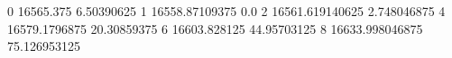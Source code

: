 0 16565.375 6.50390625
1 16558.87109375 0.0
2 16561.619140625 2.748046875
4 16579.1796875 20.30859375
6 16603.828125 44.95703125
8 16633.998046875 75.126953125
